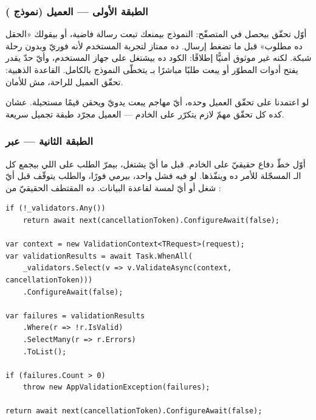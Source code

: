 \subsubsection{الطبقة الأولى — العميل (نموذج )}

أوّل تحقّق بيحصل في المتصفّح: النموذج بيمنعك تبعت رسالة فاضية، أو بيقولك «الحقل ده مطلوب» قبل ما تضغط إرسال. ده ممتاز لتجربة المستخدم لأنه فوريّ وبدون رحلة شبكة. لكنه غير موثوق أمنيًّا إطلاقًا: الكود ده بيشتغل على جهاز المستخدم، وأيّ حدّ يقدر يفتح أدوات المطوّر أو يبعت طلبًا مباشرًا بـ يتخطّى النموذج بالكامل. القاعدة الذهبية: تحقّق العميل للراحة، مش للأمان.

\begin{why}
لو اعتمدنا على تحقّق العميل وحده، أيّ مهاجم يبعت  يدويّ ويحقن قيمًا مستحيلة. عشان كده كل تحقّق مهمّ لازم يتكرّر على الخادم — العميل مجرّد طبقة تجميل سريعة.
\end{why}

\subsubsection{الطبقة الثانية —  عبر }

أوّل خطّ دفاع حقيقيّ على الخادم. قبل ما أيّ  يشتغل، بيمرّ الطلب على  اللي بيجمع كل الـ المسجّلة للأمر ده وينفّذها. لو فيه فشل واحد، بيرمي  فورًا، والطلب يتوقّف قبل أيّ شغل أو أيّ لمسة لقاعدة البيانات. ده المقتطف الحقيقيّ من :

\begin{english}
\begin{lstlisting}[language={[Sharp]C}]
if (!_validators.Any())
    return await next(cancellationToken).ConfigureAwait(false);

var context = new ValidationContext<TRequest>(request);
var validationResults = await Task.WhenAll(
    _validators.Select(v => v.ValidateAsync(context, cancellationToken)))
    .ConfigureAwait(false);

var failures = validationResults
    .Where(r => !r.IsValid)
    .SelectMany(r => r.Errors)
    .ToList();

if (failures.Count > 0)
    throw new AppValidationException(failures);

return await next(cancellationToken).ConfigureAwait(false);
\end{lstlisting}
\end{english}

